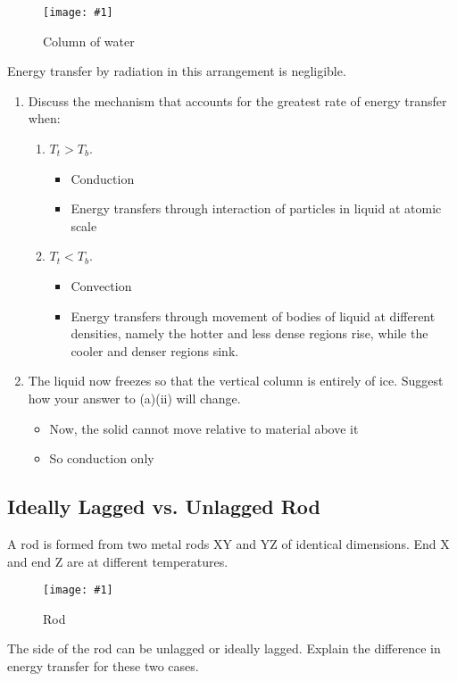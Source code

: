 \documentclass[a4paper,12pt]{article}
\newcommand{\img}[4]{\begin{center}
  \begin{figure}[H]
    \centering
    \texttt{[image: \#1]}
    \caption{#3}
    \label{fig:#4}
  \end{figure}
\end{center}}
\begin{document}
\img{ex/5.png}{0.2}{Column of water}{ex5}

Energy transfer by radiation in this arrangement is negligible.

\begin{enumerate}[label=(\alph*)]
  \item Discuss the mechanism that accounts for the greatest rate of energy transfer when:
        \begin{enumerate}[label=(\roman*)]
          \item $T_t > T_b$.
                \begin{itemize}
                  \item Conduction
                  \item Energy transfers through interaction of particles in liquid at atomic scale
                \end{itemize}
          \item $T_t < T_b$.
                \begin{itemize}
                  \item Convection
                  \item Energy transfers through movement of bodies of liquid at different densities, namely the hotter and less dense regions rise, while the cooler and denser regions sink.
                \end{itemize}
        \end{enumerate}
  \item The liquid now freezes so that the vertical column is entirely of ice. Suggest how your answer to (a)(ii) will change.\begin{itemize}
          \item Now, the solid cannot move relative to material above it
          \item So conduction only
        \end{itemize}
\end{enumerate}


\subsection{Ideally Lagged vs. Unlagged Rod}

A rod is formed from two metal rods XY and YZ of identical dimensions. End X and end Z are at different temperatures.

\img{ex/6.png}{0.5}{Rod}{ex6}


The side of the rod can be unlagged or ideally lagged. Explain the difference in energy transfer for these two cases.
\end{document}
